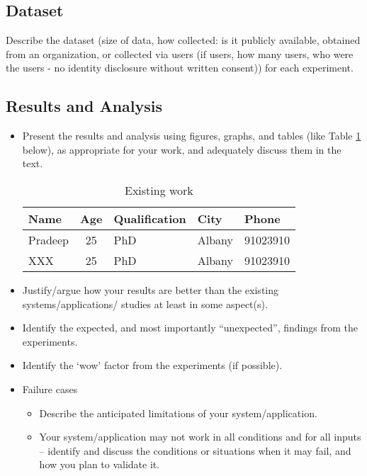 \documentclass[12pt]{article}
\begin{document}
\subsection{Dataset}\label{sec:dataset}
        Describe the dataset (size of data, how collected: is it publicly available, obtained from an organization, or collected via users (if users, how many users, who were the users - no identity disclosure without written consent)) for each experiment. 

\subsection{Results and Analysis}\label{sec:results}
    \begin{itemize}
        \item Present the results and analysis using figures, graphs, and tables (like Table \ref{tab:relatedwork} below), as appropriate for your work, and adequately discuss them in the text.

\begin{table}[h]
\begin{center}
\caption{Existing work}\label{tab:relatedwork}
\begin{tabular}{|l|c|l|l|l|}
\hline
Name & Age & Qualification & City & Phone\\
\hline
Pradeep & 25 & PhD & Albany & 91023910\\
XXX  & 25 & PhD & Albany & 91023910\\
\hline
\end{tabular}
\end{center}
\end{table}
        \item Justify/argue how your results are better than the existing systems/applications/ studies at least in some aspect(s).
 \item	Identify the expected, and most importantly “unexpected”, findings from the experiments.
 \item	Identify the `wow' factor from the experiments (if possible).
 \item	Failure cases
    \begin{itemize}
        \item Describe the anticipated limitations of your system/application.
        \item Your system/application may not work in all conditions and for all inputs – identify and discuss the conditions or situations when it may fail, and how you plan to validate it.
    \end{itemize}
\end{itemize}
\end{document}
